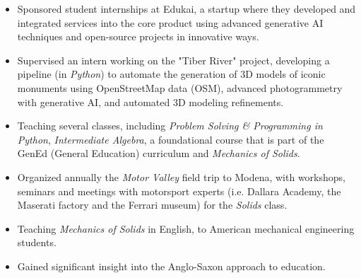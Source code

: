 	\divider

	\newline
	\begin{itemize}
		\item Sponsored student internships at Edukai, a startup where they developed and integrated services into the core product using advanced generative AI techniques and open-source projects in innovative ways.
		\item Supervised an intern working on the "Tiber River" project, developing a pipeline (in \emph{Python}) to automate the generation of 3D models of iconic monuments using OpenStreetMap data (OSM), advanced photogrammetry with generative AI, and automated 3D modeling refinements. %
	\end{itemize}
	\smallskip

	\medskip

	\newline
	\begin{itemize}
		\item Teaching several classes, including \emph{Problem Solving \& Programming in Python}, \emph{Intermediate Algebra}, a foundational course that is part of the GenEd (General Education) curriculum and \emph{Mechanics of Solids}.
		\item Organized annually the \emph{Motor Valley} field trip to Modena, with workshops, seminars and meetings with motorsport experts (i.e. Dallara Academy, the Maserati factory and the Ferrari museum) for the \emph{Solids} class.
	\end{itemize}
	\smallskip
	\medskip

	\newline
	\begin{itemize}
		\item Teaching \emph{Mechanics of Solids} in English, to American mechanical engineering students.
		\item Gained significant insight into the Anglo-Saxon approach to education.
	\end{itemize}
	\smallskip

